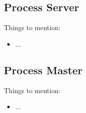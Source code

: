 \subsection{Process Server}

{
  \color{red}
  Things to mention:

  \begin{itemize}
    \item ...
  \end{itemize}
}

\subsection{Process Master}

{
  \color{red}
  Things to mention:

  \begin{itemize}
    \item ...
  \end{itemize}
}
